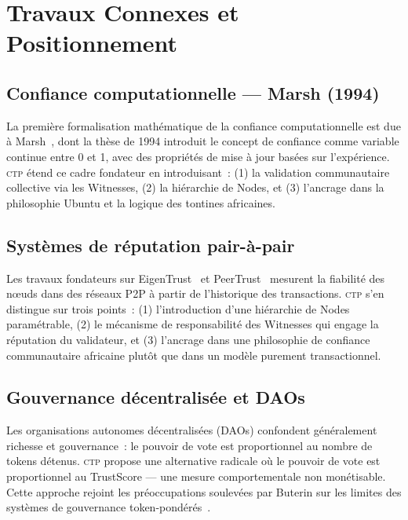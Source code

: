 \documentclass[12pt,a4paper]{article}
\theoremstyle{definition}
\theoremstyle{plain}
\theoremstyle{remark}
\newcommand{\CTP}{\textsc{ctp}}
\newcommand{\1}{\mathbf{1}}
\begin{document}
\section{Travaux Connexes et Positionnement}
\label{sec:related}

\subsection{Confiance computationnelle --- Marsh (1994)}

La première formalisation mathématique de la confiance computationnelle est
due à Marsh~\cite{marsh1994trust}, dont la thèse de 1994 introduit le
concept de confiance comme variable continue entre 0 et 1, avec des
propriétés de mise à jour basées sur l'expérience. \CTP{} étend ce cadre
fondateur en introduisant~: (1) la validation communautaire collective via
les Witnesses, (2) la hiérarchie de Nodes, et (3) l'ancrage dans la
philosophie Ubuntu et la logique des tontines africaines.

\subsection{Systèmes de réputation pair-à-pair}

Les travaux fondateurs sur EigenTrust~\cite{kamvar2003eigentrust}
et PeerTrust~\cite{xiong2004peertrust} mesurent la fiabilité
des nœuds dans des réseaux P2P à partir de l'historique des transactions.
\CTP{} s'en distingue sur trois points~: (1) l'introduction d'une
hiérarchie de Nodes paramétrable, (2) le mécanisme de responsabilité des
Witnesses qui engage la réputation du validateur, et (3) l'ancrage dans une
philosophie de confiance communautaire africaine plutôt que dans un modèle
purement transactionnel.

\subsection{Gouvernance décentralisée et DAOs}

Les organisations autonomes décentralisées (DAOs) confondent généralement
richesse et gouvernance~: le pouvoir de vote est proportionnel au nombre de
tokens détenus. \CTP{} propose une alternative radicale où le pouvoir de vote
est proportionnel au TrustScore --- une mesure comportementale non monétisable.
Cette approche rejoint les préoccupations soulevées par Buterin sur les
limites des systèmes de gouvernance token-pondérés~\cite{buterin2021governance}.
\end{document}
